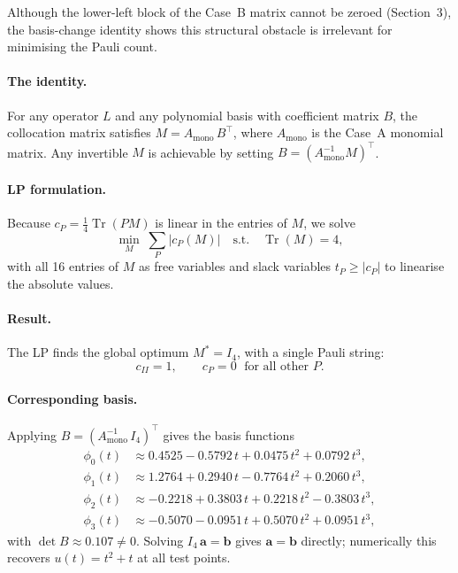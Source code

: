 \documentclass{article}
\begin{document}
Although the lower-left block of the Case~B matrix cannot be zeroed (Section~3),
the basis-change identity shows this structural obstacle is irrelevant for
minimising the Pauli count.

\paragraph{The identity.}
For any operator $L$ and any polynomial basis with coefficient matrix $B$, the
collocation matrix satisfies $M = A_{\mathrm{mono}}\,B^{\top}$, where
$A_{\mathrm{mono}}$ is the Case~A monomial matrix.  Any invertible $M$ is
achievable by setting $B=(A_{\mathrm{mono}}^{-1}M)^{\top}$.

\paragraph{LP formulation.}
Because $c_P = \tfrac{1}{4}\operatorname{Tr}(PM)$ is linear in the entries of $M$,
we solve
\begin{equation}
    \min_{M}\;\sum_{P}|c_P(M)|
    \quad\text{s.t.}\quad \operatorname{Tr}(M)=4,
\end{equation}
with all 16 entries of $M$ as free variables and slack variables $t_P\geq|c_P|$
to linearise the absolute values.

\paragraph{Result.}
The LP finds the global optimum $M^* = I_4$, with a single Pauli string:
\begin{equation}
    c_{II} = 1, \qquad c_P = 0 \;\text{ for all other }P.
\end{equation}

\paragraph{Corresponding basis.}
Applying $B=(A_{\mathrm{mono}}^{-1}\,I_4)^{\top}$ gives the basis functions
\begin{align*}
    \phi_0(t) &\approx  0.4525 - 0.5792\,t + 0.0475\,t^2 + 0.0792\,t^3, \\
    \phi_1(t) &\approx  1.2764 + 0.2940\,t - 0.7764\,t^2 + 0.2060\,t^3, \\
    \phi_2(t) &\approx -0.2218 + 0.3803\,t + 0.2218\,t^2 - 0.3803\,t^3, \\
    \phi_3(t) &\approx -0.5070 - 0.0951\,t + 0.5070\,t^2 + 0.0951\,t^3,
\end{align*}
with $\det B \approx 0.107 \neq 0$.  Solving $I_4\,\mathbf{a}=\mathbf{b}$ gives
$\mathbf{a}=\mathbf{b}$ directly; numerically this recovers
$u(t)=t^2+t$ at all test points.
\end{document}
